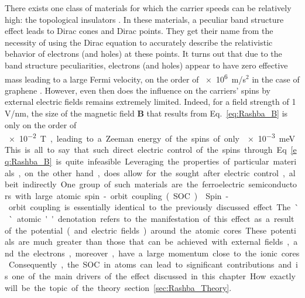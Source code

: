 There exists one class of materials for which the carrier speeds can be relatively high: the topological insulators \cite{Kane2005a,Novoselov2005,CastroNeto2009,Fu2007,Fu2006,Pesin2012}.
In these materials, a peculiar band structure effect leads to Dirac cones and Dirac points. They get their name from the necessity of using the Dirac equation to accurately describe the relativistic behavior of electrons (and holes) at these points.
It turns out that due to the band structure peculiarities, electrons (and holes) appear to have zero effective mass leading to a large Fermi velocity, on the order of \SI{e6}m/s$^2$ in the case of graphene \cite{Novoselov2005}.   
However, even then does the influence on the carriers' spins by external electric fields remains extremely limited.
Indeed, for a field strength of 1 V/nm, the size of the magnetic field $\bm B$ that results from Eq.~\eqref{eq:Rashba_B} is only on the order of \SI{e-2} T, leading to a Zeeman energy of the spins of only \SI{e-3} meV.
This is all to say that such direct electric control of the spins through Eq.~\eqref{eq:Rashba_B} is quite infeasible.

Leveraging the properties of particular materials, on the other hand, does allow for the sought after electric control, albeit indirectly.
One group of such materials are the ferroelectric semiconductors with large atomic spin-orbit coupling (SOC) \cite{Picozzi2014,DiSante2013,Ishizaka2011,Kim2014}.
Spin-orbit coupling is essentially identical to the previously discussed effect.
The ``atomic'' denotation refers to the manifestation of this effect as a result of the potential (and electric fields) around the atomic cores.
These potentials are much greater than those that can be achieved with external fields, and the electrons, moreover, have a large momentum close to the ionic cores.
Consequently, the SOC in atoms can lead to significant contributions and is one of the main drivers of the effect discussed in this chapter.
How exactly will be the topic of the theory section~\ref{sec:Rashba_Theory}.

